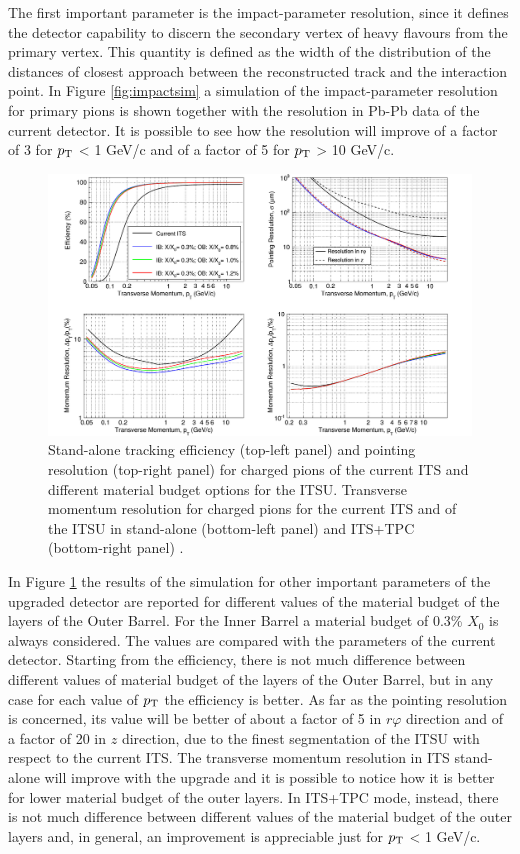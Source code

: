 %
The first important parameter is the impact-parameter resolution, since it defines the detector capability to discern the secondary vertex of heavy flavours from the primary vertex. This quantity is defined as the width of the distribution of the distances of closest approach between the reconstructed track and the interaction point. In Figure \ref{fig:impactsim} a simulation of the impact-parameter resolution for primary pions is shown together with the resolution in Pb-Pb data of the current detector. It is possible to see how the resolution will improve of a factor of 3 for $p_\text{T}$ < 1 GeV/c and of a factor of 5 for $p_\text{T}$ > 10 GeV/c.\\
%
\begin{figure}
  \centering
  \includegraphics[scale=0.4]{figures/upperf.png}
  \caption{Stand-alone tracking efficiency (top-left panel) and pointing resolution (top-right panel) for charged pions of the current ITS and different material budget options for the ITSU. Transverse momentum resolution for charged pions for the current ITS and of the ITSU in stand-alone (bottom-left panel) and ITS+TPC (bottom-right panel) \cite{uptdr}.}
  \label{fig:upperf}
\end{figure}
%
In Figure \ref{fig:upperf} the results of the simulation for other important parameters of the upgraded detector are reported for different values of the material budget of the layers of the Outer Barrel. For the Inner Barrel a material budget of 0.3\% $X_0$ is always considered. The values are compared with the parameters of the current detector. Starting from the efficiency, there is not much difference between different values of material budget of the layers of the Outer Barrel, but in any case for each value of $p_\text{T}$ the efficiency is better. As far as the pointing resolution is concerned, its value will be better of about a factor of 5 in $r\varphi$ direction and of a factor of 20 in $z$ direction, due to the finest segmentation of the ITSU with respect to the current ITS.  The transverse momentum resolution in ITS stand-alone will improve with the upgrade and it is possible to notice how it is better for lower material budget of the outer layers. In ITS+TPC mode, instead, there is not much difference between different values of the material budget of the outer layers and, in general, an improvement is appreciable just for $p_\text{T}$ < 1 GeV/c.
